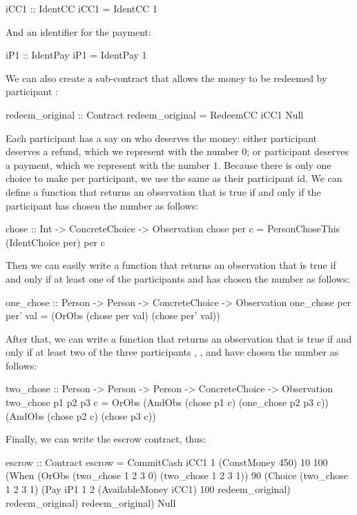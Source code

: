 \documentclass[runningheads]{llncs}
\begin{document}
\begin{haskellcode}
iCC1 :: IdentCC
iCC1 = IdentCC 1
\end{haskellcode}
And an identifier for the payment:
\begin{haskellcode}
iP1 :: IdentPay
iP1 = IdentPay 1
\end{haskellcode}
We can also create a sub-contract that allows the money to be redeemed by participant :
\begin{haskellcode}
redeem_original :: Contract
redeem_original = RedeemCC iCC1 Null
\end{haskellcode}
Each participant has a say on who deserves the money: either participant  deserves a refund, which we 
represent with the number $0$; or participant  deserves a payment, which we represent with the number 
$1$. Because there is only one choice to make per participant, we use the same  as their 
participant id. We can define a function that returns an observation that is true if and only if the participant 
 has chosen the number  as follows:
\begin{haskellcode}
chose :: Int -> ConcreteChoice -> Observation
chose per c = PersonChoseThis (IdentChoice per) per c
\end{haskellcode}
Then we can easily write a function that returns an observation that is true if and only if at least one of the 
participants  and  has chosen the number  as follows:
\begin{haskellcode}
one_chose :: Person -> Person -> ConcreteChoice -> Observation
one_chose per per' val = (OrObs (chose per val) (chose per' val)) 
\end{haskellcode}
After that, we can write a function that returns an observation that is true if and only if at least 
two of the three participants , , and  have chosen the number 
 as follows:
\begin{haskellcode}
two_chose :: Person -> Person -> Person -> ConcreteChoice -> Observation
two_chose p1 p2 p3 c = OrObs (AndObs (chose p1 c) (one_chose p2 p3 c))
                             (AndObs (chose p2 c) (chose p3 c))
\end{haskellcode}
Finally, we can write the escrow contract, thus:
\begin{haskellcode}
escrow :: Contract
escrow = CommitCash iCC1 1 (ConstMoney 450) 10 100
                    (When (OrObs (two_chose 1 2 3 0)
                                 (two_chose 1 2 3 1))
                          90
                          (Choice (two_chose 1 2 3 1)
                                  (Pay iP1 1 2 (AvailableMoney iCC1) 100
                                       redeem_original)
                                  redeem_original)
                          redeem_original)
                    Null
\end{haskellcode}
\end{document}
